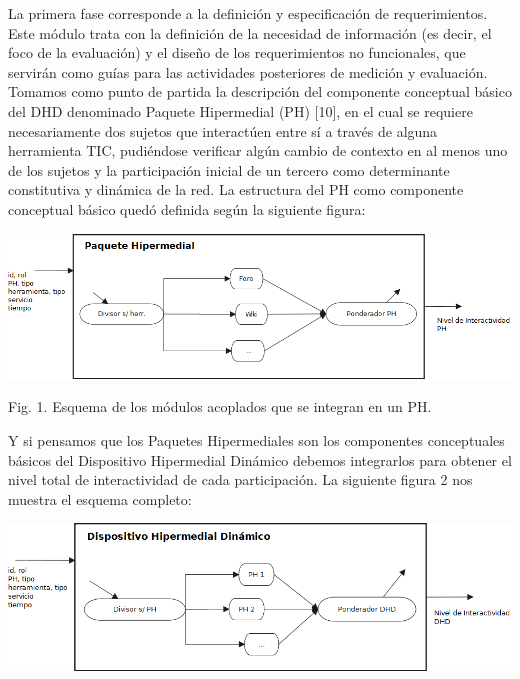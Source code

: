 La primera fase corresponde a la definición y especificación de requerimientos. Este módulo trata con la definición de la necesidad de información (es decir, el foco de la evaluación) y el diseño de los requerimientos no funcionales, que servirán como guías para las actividades posteriores de medición y evaluación.
Tomamos como punto de partida la descripción del componente conceptual básico del DHD denominado Paquete Hipermedial (PH) [10], en el cual se requiere necesariamente dos sujetos que interactúen entre sí a través de alguna herramienta TIC, pudiéndose verificar algún cambio de contexto en al menos uno de los sujetos y la participación inicial de un tercero como determinante constitutiva y dinámica de la red. La estructura del PH como componente conceptual básico quedó definida según  la siguiente figura:


\begin{center}
 \includegraphics[scale=0.4]{Ch7/f1Dev}
 \caption{..}\label{}
\end{center}


Fig. 1. Esquema de los módulos acoplados que se integran en un PH.

Y si pensamos que los Paquetes Hipermediales son los componentes conceptuales básicos del Dispositivo Hipermedial Dinámico debemos integrarlos para obtener el nivel total de interactividad de cada participación. La siguiente figura 2 nos muestra el esquema completo:

\begin{center}
 \includegraphics[scale=0.4]{Ch7/f2Dev}
  \caption{..}\label{}
\end{center}


